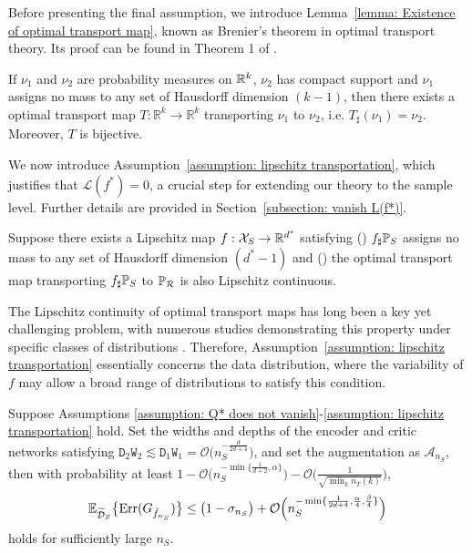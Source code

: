 Before presenting the final assumption, we introduce Lemma~\ref{lemma: Existence of optimal transport map}, known as Brenier's theorem in optimal transport theory. Its proof can be found in Theorem 1 of \citet{ball2004transport}.
\begin{lemma}\label{lemma: Existence of optimal transport map}
If $\nu_1$ and $\nu_2$ are probability measures on $\R^k$, $\nu_2$ has compact support and $\nu_1$ assigns no mass to any set of Hausdorff dimension $(k - 1)$, then there exists a optimal transport map $T: \mathbb{R}^k \to \mathbb{R}^k$ transporting $\nu_1$ to $\nu_2$, i.e. $T_{\sharp}(\nu_1) = \nu_2$. Moreover, $T$ is bijective.
\end{lemma}
We now introduce Assumption~\ref{assumption: lipschitz transportation}, which justifies that $\mathcal{L}(f^*) = 0$, a crucial step for extending our theory to the sample level. Further details are provided in Section~\ref{subsection: vanish L(f*)}.
\begin{assumption}\label{assumption: lipschitz transportation}
    Suppose there exists a Lipschitz map $f : \mathcal{X}_S \to \R^{d^*}$ satisfying () $f_{\sharp}\P_S$ assigns no mass to any set of Hausdorff dimension $(d^*-1)$ and () the optimal transport map transporting $f_{\sharp}\P_S$ to $\P_\mathcal{R}$ is also Lipschitz continuous.
\end{assumption}
The Lipschitz continuity of optimal transport maps has long been a key yet challenging problem, with numerous studies demonstrating this property under specific classes of distributions \citep{caffarelli2000monotonicity, kim2012generlization, carlier2024optimal, fathi2024transportation}. Therefore, Assumption~\ref{assumption: lipschitz transportation} essentially concerns the data distribution, where the variability of $f$ may allow a broad range of distributions to satisfy this condition.
\begin{theorem}\label{theorem: sample theorem}
Suppose Assumptions \ref{assumption: Q* does not vanish}-\ref{assumption: lipschitz transportation} hold. Set the widths and depths of the encoder and critic networks satisfying $\mathtt{D}_2\mathtt{W}_2\lesssim\mathtt{D}_1\mathtt{W}_1 = \mathcal{O}\big(n_S^{-\frac{d}{2d+4}}\big)$, and set the augmentation as $\mathcal{A}_{n_S}$, then with probability at least $1 - \mathcal{O}\big(n_S^{-\min\{\frac{1}{d+2}, \alpha\}}\big) - \mathcal{O}\big(\frac{1}{\sqrt{\min_{k}n_T(k)}}\big)$,
\begin{align*}
    \E_{\widetilde{\mathcal{D}}_S}\big\{\mathrm{Err}(G_{\hat{f}_{n_S}})\big\} \leq \big(1 - \sigma_{n_S}\big) + \mathcal{O}\Big(n_S^{-\min\{\frac{1}{2d+4}, \frac{\alpha}{4}, \frac{\beta}{4}\}}\Big)
\end{align*}
holds for sufficiently large $n_S$.
\end{theorem}
